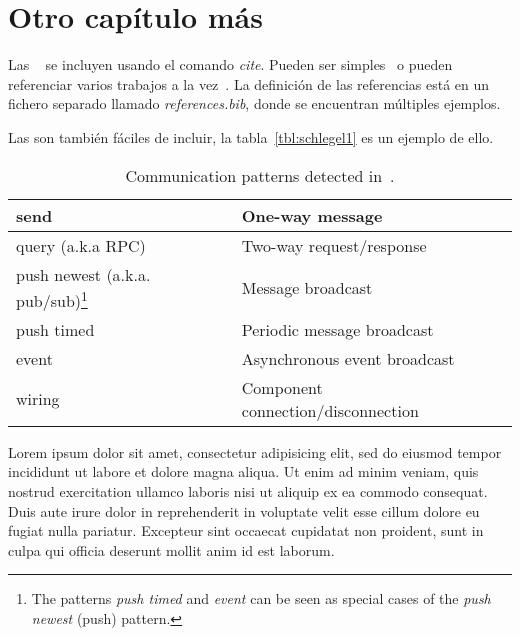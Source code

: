 \chapter{Otro capítulo más}

Las ~\cite{Smith-2006} se incluyen usando el comando \textit{cite}. Pueden ser simples~\cite{Smith-2006} o pueden referenciar varios trabajos a la vez~\cite{Smith-2006,Schlegel-2006}. La definición de las referencias está en un fichero separado llamado \textit{references.bib}, donde se encuentran múltiples ejemplos.

\par
Las  son también fáciles de incluir, la tabla~\ref{tbl:schlegel1} es un ejemplo de ello. 
\begin{table}[thbp]
\centering
\caption{Communication patterns detected in~\cite{Schlegel-2006}.} 
\begin{centering}
 \begin{minipage}{0.9\textwidth}\label{tbl:schlegel1}
  \centering
  \begin{tabular}{|l|l|} 
   \hline
send & One-way message \\ \hline
query (a.k.a RPC) & Two-way request/response \\ \hline
push newest (a.k.a. pub/sub)\footnote{\label{note_patterns}The patterns \textit{push timed} and \textit{event} can be seen as special cases of the \textit{push newest} (push) pattern.} & Message broadcast \\ \hline
push timed & Periodic message broadcast \\ \hline
event & Asynchronous event broadcast \\ \hline
wiring & Component connection/disconnection \\ \hline
   \end{tabular} 
  \end{minipage}
 \end{centering} 
\end{table}
\par
\par
Lorem ipsum dolor sit amet, consectetur adipisicing elit, sed do eiusmod tempor incididunt ut labore et dolore magna aliqua. Ut enim ad minim veniam, quis nostrud exercitation ullamco laboris nisi ut aliquip ex ea commodo consequat. Duis aute irure dolor in reprehenderit in voluptate velit esse cillum dolore eu fugiat nulla pariatur. Excepteur sint occaecat cupidatat non proident, sunt in culpa qui officia deserunt mollit anim id est laborum.


